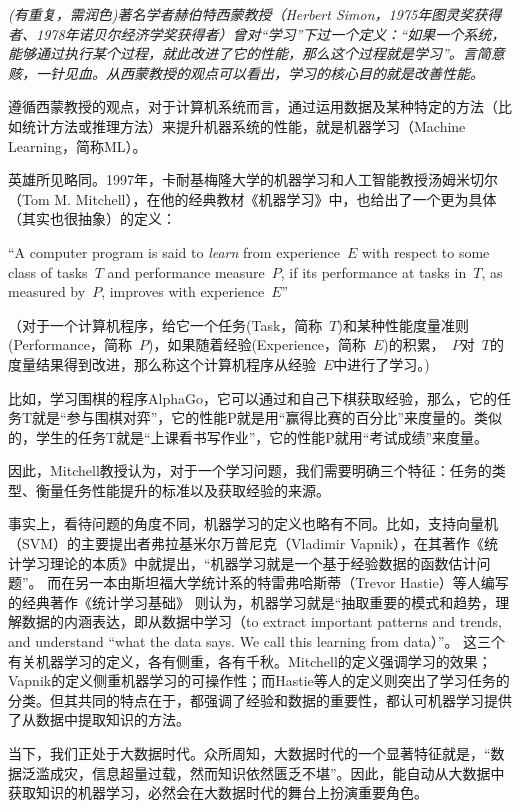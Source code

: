 {\em (有重复，需润色)著名学者赫伯特\textperiodcentered 西蒙教授（Herbert Simon，1975年图灵奖获得者、1978年诺贝尔经济学奖获得者）曾对“学习”下过一个定义：“如果一个系统，能够通过执行某个过程，就此改进了它的性能，那么这个过程就是学习”。言简意赅，一针见血。从西蒙教授的观点可以看出，学习的核心目的就是改善性能。

遵循西蒙教授的观点，对于计算机系统而言，通过运用数据及某种特定的方法（比如统计方法或推理方法）来提升机器系统的性能，就是机器学习（Machine Learning，简称ML）。

英雄所见略同。1997年，卡耐基梅隆大学的机器学习和人工智能教授汤姆\textperiodcentered 米切尔（Tom M. Mitchell），在他的经典教材《机器学习》\cite{mitchell1997}中，也给出了一个更为具体（其实也很抽象）的定义：

“A computer program is said to {\em learn} from experience~$ E$ with respect to some class of tasks~$T$ and performance measure~$P$, if its performance at tasks in~$T$, as measured by~$P$, improves with experience~$E$”

（对于一个计算机程序，给它一个任务(Task，简称~$T$)和某种性能度量准则(Performance，简称~$P$)，如果随着经验(Experience，简称~$E$)的积累，~$P$对~$T$的度量结果得到改进，那么称这个计算机程序从经验~$E$中进行了学习。)

比如，学习围棋的程序AlphaGo，它可以通过和自己下棋获取经验，那么，它的任务T就是“参与围棋对弈”，它的性能P就是用“赢得比赛的百分比”来度量的。类似的，学生的任务T就是“上课看书写作业”，它的性能P就用“考试成绩”来度量。

因此，Mitchell教授认为，对于一个学习问题，我们需要明确三个特征：任务的类型、衡量任务性能提升的标准以及获取经验的来源。

事实上，看待问题的角度不同，机器学习的定义也略有不同。比如，支持向量机（SVM）的主要提出者弗拉基米尔\textperiodcentered 万普尼克（Vladimir Vapnik），在其著作《统计学习理论的本质》\cite{vapnik2000中文}中就提出，“机器学习就是一个基于经验数据的函数估计问题”。
而在另一本由斯坦福大学统计系的特雷弗\textperiodcentered 哈斯蒂（Trevor Hastie）等人编写的经典著作《统计学习基础》\cite{hastie2015} 则认为，机器学习就是“抽取重要的模式和趋势，理解数据的内涵表达，即从数据中学习（to extract important patterns and trends, and understand “what the data says. We call this learning from data）”。
这三个有关机器学习的定义，各有侧重，各有千秋。Mitchell的定义强调学习的效果；Vapnik的定义侧重机器学习的可操作性；而Hastie等人的定义则突出了学习任务的分类。但其共同的特点在于，都强调了经验和数据的重要性，都认可机器学习提供了从数据中提取知识的方法。

当下，我们正处于大数据时代。众所周知，大数据时代的一个显著特征就是，“数据泛滥成灾，信息超量过载，然而知识依然匮乏不堪”。因此，能自动从大数据中获取知识的机器学习，必然会在大数据时代的舞台上扮演重要角色。}

